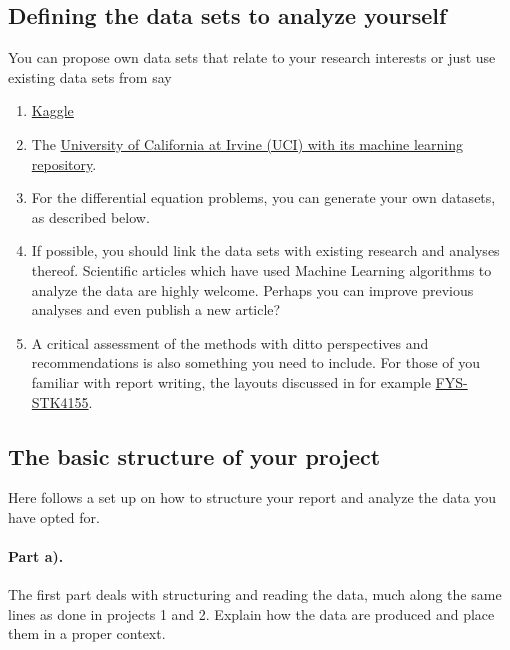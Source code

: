 \documentclass[%
oneside,                 %
final,                   %
10pt]{article}
\begin{document}
\noindent
\subsection{Defining the data sets to analyze yourself}

You can propose own data sets that relate to your research interests or just use existing data sets from say
\begin{enumerate}
\item \href{{https://www.kaggle.com/datasets}}{Kaggle} 

\item The \href{{https://archive.ics.uci.edu/ml/index.php}}{University of California at Irvine (UCI) with its  machine learning repository}.

\item For the differential equation problems, you can generate your own datasets, as described below.

\item If possible, you should link the data sets with existing research and analyses thereof. Scientific articles which have used Machine Learning algorithms to analyze the data are highly welcome. Perhaps you can improve previous analyses and even publish a new article? 

\item A critical assessment of the methods with ditto perspectives and recommendations is also something you need to include. For those of you familiar with report writing, the layouts discussed in for example \href{{https://github.com/CompPhysics/MachineLearning/blob/master/doc/Projects/EvaluationGrading/EvaluationForm.md}}{FYS-STK4155}.
\end{enumerate}

\noindent
\subsection{The basic structure of your project}

Here follows a set up on how to structure your report and analyze the data you have opted for.

\paragraph{Part a).}
The first part deals with structuring and reading the data, much along the same lines as done in projects 1 and 2.  Explain how the data are produced and place them in a proper context.
\end{document}
